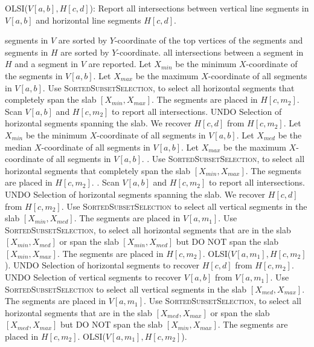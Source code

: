 \begin{algorithm}
  \caption{OLSI($V[a,b],H[c,d]$): Report all intersections between vertical line segments in $V[a,b]$ and horizontal line segments $H[c,d]$.} \label{alg:orth}
  \begin{algorithmic}[1]
    \REQUIRE segments in $V$ are sorted by $Y$-coordinate of the top vertices of the segments and segments in $H$ are sorted by $Y$-coordinate.
    \ENSURE all intersections between a segment in $H$ and a segment in $V$ are reported.
       \STATE {}
       \STATE Let $X_{min}$ be the minimum $X$-coordinate of the segments in $V[a,b]$.
       \STATE Let $X_{max}$ be the maximum $X$-coordinate of all segments in $V[a,b]$.
       \STATE Use \textsc{SortedSubsetSelection}, to select all horizontal segments that completely span the slab $[X_{min},X_{max}]$.
              The segments are placed in $H[c,m_2]$.
       \STATE Scan $V[a,b]$ and $H[c,m_2]$ to report all intersections.
       \STATE UNDO Selection of horizontal segments spanning the slab. We recover $H[c,d]$ from $H[c,m_2]$.
    \ELSE
       \STATE Let $X_{min}$ be the minimum $X$-coordinate of all segments in $V[a,b]$.
       \STATE Let $X_{med}$ be the median $X$-coordinate of all segments in $V[a,b]$.
       \STATE Let $X_{max}$ be the maximum $X$-coordinate of all segments in $V[a,b]$.
       \STATE {}.
       \STATE Use \textsc{SortedSubsetSelection}, to select all horizontal segments that completely span the slab $[X_{min},X_{max}]$.
              The segments are placed in $H[c,m_2]$.
              .
       \STATE Scan $V[a,b]$ and $H[c,m_2]$ to report all intersections.
       \STATE UNDO Selection of horizontal segments spanning the slab. We recover $H[c,d]$ from $H[c,m_2]$.
       \STATE Use \textsc{SortedSubsetSelection} to select all vertical segments in the slab $[X_{min},X_{med}]$.
              The segments are placed in $V[a,m_1]$.
       \STATE Use \textsc{SortedSubsetSelection}, to select all horizontal segments that are in the slab $[X_{min},X_{med}]$ or span the slab $[X_{min},X_{med}]$ but
              DO NOT span the slab $[X_{min},X_{max}]$.
              The segments are placed in $H[c,m_2]$.
       \STATE OLSI($V[a,m_1],H[c,m_2]$).
       \STATE UNDO Selection of horizontal segments to recover $H[c,d]$ from $H[c,m_2]$.
       \STATE UNDO Selection of vertical segments to recover $V[a,b]$ from $V[a,m_1]$.
       \STATE Use \textsc{SortedSubsetSelection} to select all vertical segments in the slab $[X_{med},X_{max}]$.
              The segments are placed in $V[a,m_1]$.
       \STATE Use \textsc{SortedSubsetSelection}, to select all horizontal segments that are in the slab $[X_{med},X_{max}]$ or span the slab $[X_{med},X_{max}]$ but
              DO NOT span the slab $[X_{min},X_{max}]$.
              The segments are placed in $H[c,m_2]$.
       \STATE OLSI($V[a,m_1],H[c,m_2]$).
   \ENDIF
  \end{algorithmic}
\end{algorithm}

